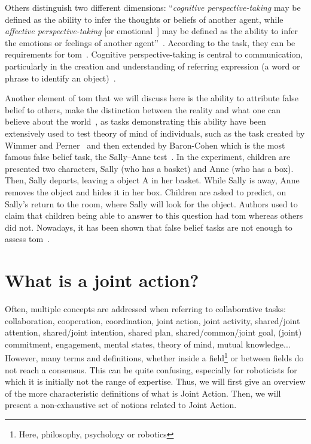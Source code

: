 \documentclass[a4paper,11pt,twoside]{StyleThese}
\begin{document}
Others distinguish two different dimensions: ``\emph{cognitive perspective-taking} may be defined as the ability to infer the thoughts or beliefs of another agent, while \emph{affective perspective-taking} [or emotional~\cite{hynes_2006_differential}] may be defined as the ability to infer the emotions or feelings of another agent''~\cite{healey_2018_cognitive}. According to the task, they can be requirements for \acrshort{tom}~\cite{hynes_2006_differential}. Cognitive perspective-taking is central to communication, particularly in the creation and understanding of referring expression (\ie a word or phrase to identify an object)~\cite{krauss_1991_perspective}.

\bigskip

Another element of \acrshort{tom} that we will discuss here is the ability to attribute false belief to others, \ie make the distinction between the reality and what one can believe about the world~\cite{dennett_1978_brainstorms}, as tasks demonstrating this ability have been extensively used to test theory of mind of individuals, such as the task created by Wimmer and Perner~\cite{wimmer_1983_beliefs} and then extended by Baron-Cohen \etal{} which is the most famous false belief task, the Sally--Anne test~\cite{wimmer_1983_beliefs, baron_1985_does}. In the experiment, children are presented two characters, Sally (who has a basket) and Anne (who has a box). Then, Sally departs, leaving a object A in her basket. While Sally is away, Anne removes the object and hides it in her box. Children are asked to predict, on Sally's return to the room, where Sally will look for the object. Authors used to claim that children being able to answer to this question had \acrshort{tom} whereas others did not. Nowadays, it has been shown that false belief tasks are not enough to assess \acrshort{tom}~\cite{bloom_2000_two, wellman_2001_meta}.

\section{What is a joint action?}\label{chap1:sec:ja}
Often, multiple concepts are addressed when referring to collaborative tasks: collaboration, cooperation, coordination, joint action, joint activity, shared/joint attention, shared/joint intention, shared plan, shared/common/joint goal, (joint) commitment, engagement, mental states, theory of mind, mutual knowledge... However, many terms and definitions, whether inside a field\footnote{Here, philosophy, psychology or robotics} or between fields do not reach a consensus. This can be quite confusing, especially for roboticists for which it is initially not the range of expertise. Thus, we will first give an overview of the more characteristic definitions of what is Joint Action. Then, we will present a non-exhaustive set of notions related to Joint Action. 
\end{document}
